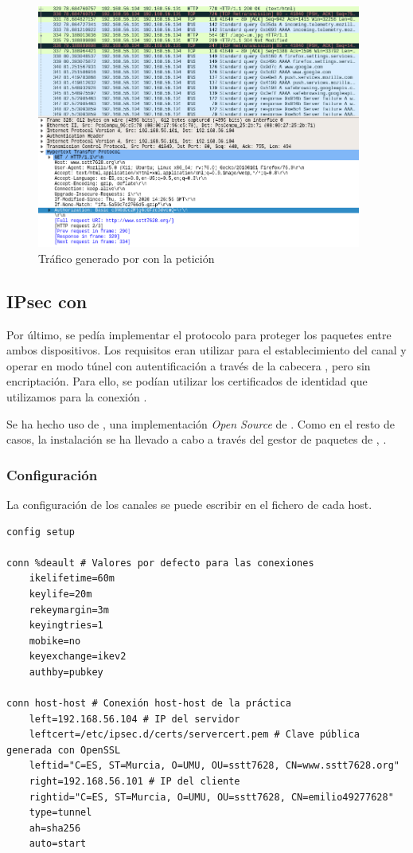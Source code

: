 \begin{figure}[h]
    \centering
    \includegraphics[width=0.95\textwidth]{tests/capture-https.png}
    \caption{Tráfico generado por  con la petición {\HTTPs}}
    \label{img-cap-https}
\end{figure}


\subsection{IPsec con }
Por último, se pedía implementar el protocolo {\IPsec} para proteger los paquetes {\IP} entre ambos dispositivos. Los requisitos eran utilizar  para el establecimiento del canal y operar en modo túnel con autentificación a través de la cabecera , pero sin encriptación. Para ello, se podían utilizar los certificados de identidad que utilizamos para la conexión {\HTTPs}.

Se ha hecho uso de , una implementación \textit{Open Source} de {\IPsec}. Como en el resto de casos, la instalación se ha llevado a cabo a través del gestor de paquetes de , .

\subsubsection{Configuración}
La configuración de los canales se puede escribir en el fichero  de cada host.

\begin{lstlisting}[title=Fichero \file{/etc/ipsec.conf} del servidor]
config setup

conn %deault # Valores por defecto para las conexiones
	ikelifetime=60m
	keylife=20m
	rekeymargin=3m
	keyingtries=1
	mobike=no
	keyexchange=ikev2
	authby=pubkey

conn host-host # Conexión host-host de la práctica
	left=192.168.56.104 # IP del servidor
	leftcert=/etc/ipsec.d/certs/servercert.pem # Clave pública generada con OpenSSL
	leftid="C=ES, ST=Murcia, O=UMU, OU=sstt7628, CN=www.sstt7628.org"
	right=192.168.56.101 # IP del cliente
	rightid="C=ES, ST=Murcia, O=UMU, OU=sstt7628, CN=emilio49277628"
	type=tunnel
	ah=sha256
	auto=start
\end{lstlisting}


